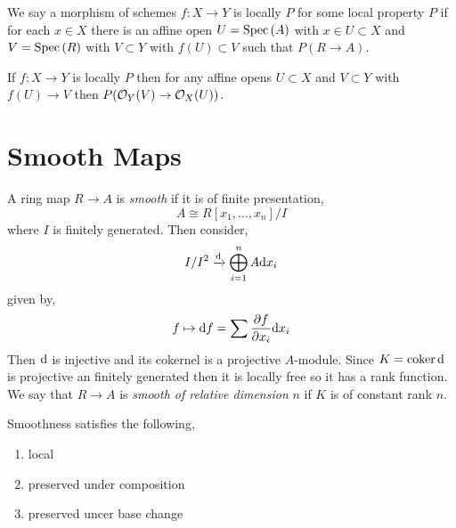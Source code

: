 \documentclass[12pt]{article}
\begin{document}
\begin{defn}
We say a morphism of schemes $f : X \to Y$ is locally $P$ for some local property $P$ if for each $x \in X$ there is an affine open $U = \mathrm{Spec}\left( A \right)$ with $x \in U \subset X$ and $V = \mathrm{Spec}\left( R \right)$ with $V \subset Y$ with $f(U) \subset V$ such that $P(R \to A)$. 
\end{defn}

\begin{lemma}
If $f : X \to Y$ is locally $P$ then for any affine opens $U \subset X$ and $V \subset Y$ with $f(U) \to V$ then $P(\mathcal{O}_{Y}(V) \to \mathcal{O}_{X}(U))$. 
\end{lemma}

\begin{rmk}

\end{rmk}

\section{Smooth Maps}

\begin{defn}
A ring map $R \to A$ is \textit{smooth} if it is of finite presentation,
\[ A \cong R[x_1, \dots, x_n]/I \]
where $I$ is finitely generated. Then consider,
\[ I / I^2 \xrightarrow{\mathrm{d}} \bigoplus_{i = 1}^n A \mathrm{d}{x_i}  \]
given by,
\[ f \mapsto \mathrm{d}{f} = \sum \frac{\partial{f}}{\partial{x_i}} \mathrm{d}{x_i} \]
Then $\mathrm{d}$ is injective and its cokernel is a projective $A$-module. Since $K = \operatorname{\mathrm{coker}}{\mathrm{d}}$ is projective an finitely generated then it is locally free so it has a rank function. We say that $R \to A$ is \textit{smooth of relative dimension} $n$ if $K$ is of constant rank $n$.
\end{defn}

\begin{rmk}
Smoothness satisfies the following,
\begin{enumerate}
\item local
\item preserved under composition
\item preserved uncer base change 
\end{enumerate}
\end{rmk}
\end{document}
